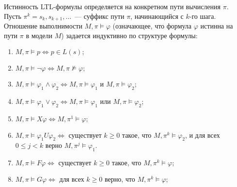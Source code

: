 \begin{definition}\label{def:ltl_semantics}
    Истинность LTL-формулы определяется на конкретном пути вычисления $\pi$. Пусть $\pi^k = s_k, s_{k+1}, \dots$~--- суффикс пути $\pi$, начинающийся с $k$-го шага. Отношение выполнимости $M, \pi \models \varphi$ (означающее, что формула $\varphi$ истинна на пути $\pi$ в модели $M$) задается индуктивно по структуре формулы:
    \begin{enumerate}
        \item $M, \pi \models p \Leftrightarrow p \in L(s)$;
        \item $M, \pi \models \neg\varphi \Leftrightarrow M, \pi \not\models \varphi$;
        \item $M, \pi \models \varphi_1 \land \varphi_2 \Leftrightarrow M, \pi \models \varphi_1$ и $M, \pi \models \varphi_2$;
        \item $M, \pi \models \varphi_1 \lor \varphi_2 \Leftrightarrow M, \pi \models \varphi_1$ или $M, \pi \models \varphi_2$;
        \item $M, \pi \models X\varphi \Leftrightarrow M, \pi^1 \models \varphi$;
        \item $M, \pi \models \varphi_1 U \varphi_2 \Leftrightarrow$ существует $k \ge 0$ такое, что $M, \pi^k \models \varphi_2$, и для всех $0 \le j < k$ верно $M, \pi^j \models \varphi_1$.
        \item $M, \pi \models F\varphi \Leftrightarrow$ существует $k \ge 0$ такое, что $M, \pi^k \models \varphi$;
        \item $M, \pi \models G\varphi \Leftrightarrow$ для всех $k \ge 0$ верно, что $M, \pi^k \models \varphi$;
    \end{enumerate}
\end{definition}

